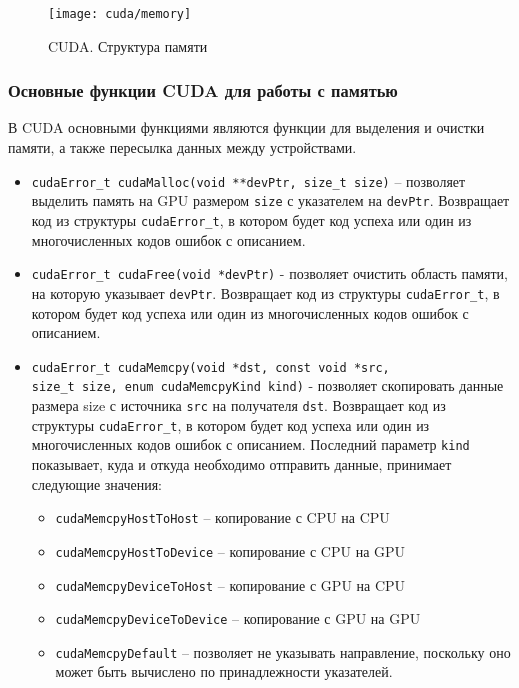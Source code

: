 \begin{figure}[H]
    \texttt{[image: cuda/memory]}
    \caption{CUDA. Структура памяти}
    \label{CudaMemory:image}
\end{figure}

\subsubsection*{Основные функции CUDA для работы с памятью}
В CUDA основными функциями являются функции для выделения и очистки памяти, а также пересылка данных между устройствами.
\begin{itemize}
    \item\texttt{cudaError\_t cudaMalloc(void **devPtr, size\_t size)} -- поз\-во\-ля\-ет выделить память на GPU размером \texttt{size} с указателем на \texttt{devPtr}. Возвращает код из структуры \texttt{cudaError\_t}, в котором будет код успеха или один из многочисленных кодов ошибок с описанием.
    \item\texttt{cudaError\_t cudaFree(void *devPtr)} - позволяет очистить область памяти, на которую указывает \texttt{devPtr}. Возвращает код из структуры \texttt{cudaError\_t}, в котором будет код успеха или один из многочисленных кодов ошибок с описанием.
    \item\texttt{cudaError\_t cudaMemcpy(void *dst, const void *src, \\ size\_t size, enum cudaMemcpyKind kind)} - позволяет скопировать данные размера size с источника \texttt{src} на получателя \texttt{dst}. Возвращает код из структуры \texttt{cudaError\_t}, в котором будет код успеха или один из многочисленных кодов ошибок с описанием. Последний параметр \texttt{kind} показывает, куда и откуда необходимо отправить данные, принимает следующие значения:
    \begin{itemize}
        \item \texttt{cudaMemcpyHostToHost} -- копирование с CPU на CPU
        \item \texttt{cudaMemcpyHostToDevice} -- копирование с CPU на GPU
        \item \texttt{cudaMemcpyDeviceToHost} -- копирование с GPU на CPU
        \item \texttt{cudaMemcpyDeviceToDevice} -- копирование с GPU на GPU
        \item \texttt{cudaMemcpyDefault} -- позволяет не указывать направление, поскольку оно может быть вычислено по принадлежности указателей.
    \end{itemize}
\end{itemize}

